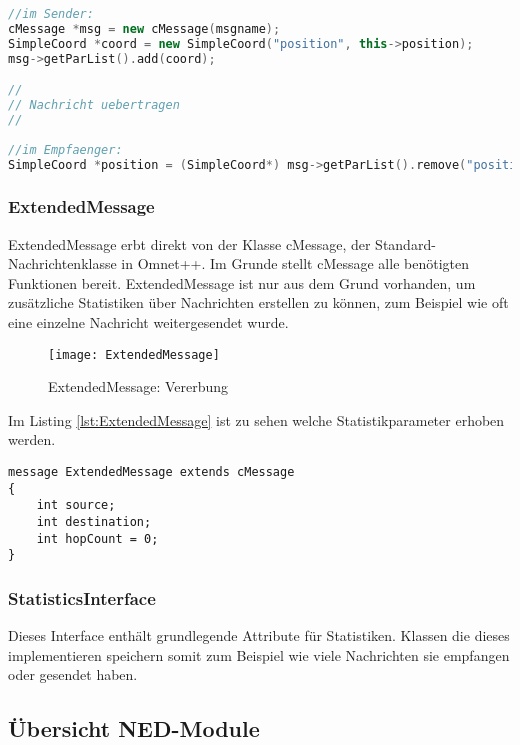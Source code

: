 \begin{lstlisting}[language=C++, label=lst:SimpleExample]
//im Sender:
cMessage *msg = new cMessage(msgname);
SimpleCoord *coord = new SimpleCoord("position", this->position);
msg->getParList().add(coord);

//
// Nachricht uebertragen    
//  
  
//im Empfaenger:  
SimpleCoord *position = (SimpleCoord*) msg->getParList().remove("position");
\end{lstlisting}

\subsubsection{ExtendedMessage}

ExtendedMessage erbt direkt von der Klasse cMessage, der Standard-Nachrichtenklasse in Omnet++. Im Grunde stellt cMessage alle benötigten Funktionen bereit. ExtendedMessage ist nur aus dem Grund vorhanden, um zusätzliche Statistiken über Nachrichten erstellen zu können, zum Beispiel wie oft eine einzelne Nachricht weitergesendet wurde.

\begin{figure}[htbp]
\centering
\caption{ExtendedMessage: Vererbung}
\texttt{[image: ExtendedMessage]}
\end{figure}

Im Listing \ref{lst:ExtendedMessage} ist zu sehen welche Statistikparameter erhoben werden.

\begin{minipage}{\textwidth}
\begin{lstlisting}[language=NED, label=lst:ExtendedMessage]
message ExtendedMessage extends cMessage
{
	int source;
    int destination;
    int hopCount = 0;    
}
\end{lstlisting}
\end{minipage}
\subsubsection{StatisticsInterface}

Dieses Interface enthält grundlegende Attribute für Statistiken. Klassen die dieses implementieren speichern somit zum Beispiel wie viele Nachrichten sie empfangen oder gesendet haben.


\subsection{Übersicht NED-Module}


